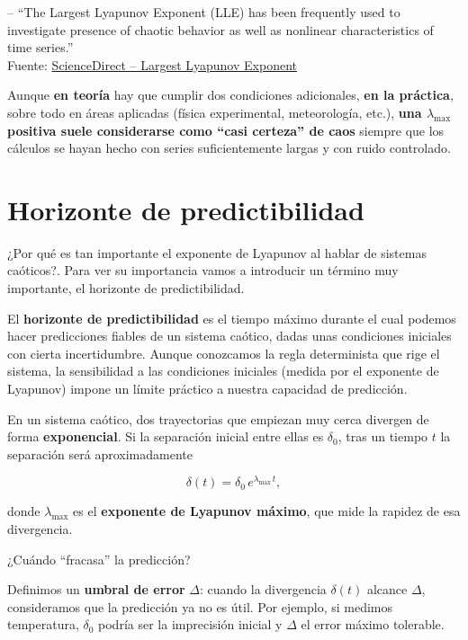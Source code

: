 \documentclass[
  11pt,
  a4paper,
  DIV=11,
  numbers=noendperiod]{scrreprt}
\begin{document}
-- ``The Largest Lyapunov Exponent (LLE) has been frequently used to
investigate presence of chaotic behavior as well as nonlinear
characteristics of time series.''\\
Fuente:
\href{https://www.sciencedirect.com/topics/engineering/largest-lyapunov-exponent}{ScienceDirect
-- Largest Lyapunov Exponent}

Aunque \textbf{en teoría} hay que cumplir dos condiciones adicionales,
\textbf{en la práctica}, sobre todo en áreas aplicadas (física
experimental, meteorología, etc.), \textbf{una \(\lambda_{\max}\)
positiva suele considerarse como ``casi certeza'' de caos} siempre que
los cálculos se hayan hecho con series suficientemente largas y con
ruido controlado.

\section{Horizonte de
predictibilidad}\label{horizonte-de-predictibilidad}

¿Por qué es tan importante el exponente de Lyapunov al hablar de
sistemas caóticos?. Para ver su importancia vamos a introducir un
término muy importante, el horizonte de predictibilidad.

El \textbf{horizonte de predictibilidad} es el tiempo máximo durante el
cual podemos hacer predicciones fiables de un sistema caótico, dadas
unas condiciones iniciales con cierta incertidumbre. Aunque conozcamos
la regla determinista que rige el sistema, la sensibilidad a las
condiciones iniciales (medida por el exponente de Lyapunov) impone un
límite práctico a nuestra capacidad de predicción.

En un sistema caótico, dos trayectorias que empiezan muy cerca divergen
de forma \textbf{exponencial}. Si la separación inicial entre ellas es
\(\delta_0\), tras un tiempo \(t\) la separación será aproximadamente

\[
\delta(t) = \delta_0\,e^{\lambda_{\max}\,t},
\]

donde \(\lambda_{\max}\) es el \textbf{exponente de Lyapunov máximo},
que mide la rapidez de esa divergencia.

¿Cuándo ``fracasa'' la predicción?

Definimos un \textbf{umbral de error} \(\Delta\): cuando la divergencia
\(\delta(t)\) alcance \(\Delta\), consideramos que la predicción ya no
es útil. Por ejemplo, si medimos temperatura, \(\delta_0\) podría ser la
imprecisión inicial y \(\Delta\) el error máximo tolerable.
\end{document}
